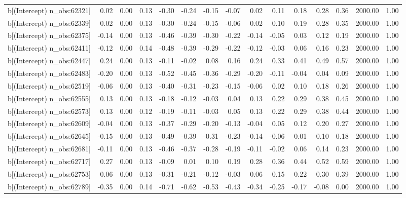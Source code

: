 \begin{table}[ht]
\begin{tabular}{rrrrrrrrrrrrrrr}
  b[(Intercept) n\_obs:62321] & 0.02 & 0.00 & 0.13 & -0.30 & -0.24 & -0.15 & -0.07 & 0.02 & 0.11 & 0.18 & 0.28 & 0.36 & 2000.00 & 1.00 \\ 
  b[(Intercept) n\_obs:62339] & 0.02 & 0.00 & 0.13 & -0.30 & -0.24 & -0.15 & -0.06 & 0.02 & 0.10 & 0.19 & 0.28 & 0.35 & 2000.00 & 1.00 \\ 
  b[(Intercept) n\_obs:62375] & -0.14 & 0.00 & 0.13 & -0.46 & -0.39 & -0.30 & -0.22 & -0.14 & -0.05 & 0.03 & 0.12 & 0.19 & 2000.00 & 1.00 \\ 
  b[(Intercept) n\_obs:62411] & -0.12 & 0.00 & 0.14 & -0.48 & -0.39 & -0.29 & -0.22 & -0.12 & -0.03 & 0.06 & 0.16 & 0.23 & 2000.00 & 1.00 \\ 
  b[(Intercept) n\_obs:62447] & 0.24 & 0.00 & 0.13 & -0.11 & -0.02 & 0.08 & 0.16 & 0.24 & 0.33 & 0.41 & 0.49 & 0.57 & 2000.00 & 1.00 \\ 
  b[(Intercept) n\_obs:62483] & -0.20 & 0.00 & 0.13 & -0.52 & -0.45 & -0.36 & -0.29 & -0.20 & -0.11 & -0.04 & 0.04 & 0.09 & 2000.00 & 1.00 \\ 
  b[(Intercept) n\_obs:62519] & -0.06 & 0.00 & 0.13 & -0.40 & -0.31 & -0.23 & -0.15 & -0.06 & 0.02 & 0.10 & 0.18 & 0.26 & 2000.00 & 1.00 \\ 
  b[(Intercept) n\_obs:62555] & 0.13 & 0.00 & 0.13 & -0.18 & -0.12 & -0.03 & 0.04 & 0.13 & 0.22 & 0.29 & 0.38 & 0.45 & 2000.00 & 1.00 \\ 
  b[(Intercept) n\_obs:62573] & 0.13 & 0.00 & 0.12 & -0.19 & -0.11 & -0.03 & 0.05 & 0.13 & 0.22 & 0.29 & 0.38 & 0.44 & 2000.00 & 1.00 \\ 
  b[(Intercept) n\_obs:62609] & -0.04 & 0.00 & 0.13 & -0.37 & -0.29 & -0.20 & -0.13 & -0.04 & 0.05 & 0.12 & 0.20 & 0.27 & 2000.00 & 1.00 \\ 
  b[(Intercept) n\_obs:62645] & -0.15 & 0.00 & 0.13 & -0.49 & -0.39 & -0.31 & -0.23 & -0.14 & -0.06 & 0.01 & 0.10 & 0.18 & 2000.00 & 1.00 \\ 
  b[(Intercept) n\_obs:62681] & -0.11 & 0.00 & 0.13 & -0.46 & -0.37 & -0.28 & -0.19 & -0.11 & -0.02 & 0.06 & 0.14 & 0.23 & 2000.00 & 1.00 \\ 
  b[(Intercept) n\_obs:62717] & 0.27 & 0.00 & 0.13 & -0.09 & 0.01 & 0.10 & 0.19 & 0.28 & 0.36 & 0.44 & 0.52 & 0.59 & 2000.00 & 1.00 \\ 
  b[(Intercept) n\_obs:62753] & 0.06 & 0.00 & 0.13 & -0.31 & -0.21 & -0.12 & -0.03 & 0.06 & 0.15 & 0.22 & 0.30 & 0.39 & 2000.00 & 1.00 \\ 
  b[(Intercept) n\_obs:62789] & -0.35 & 0.00 & 0.14 & -0.71 & -0.62 & -0.53 & -0.43 & -0.34 & -0.25 & -0.17 & -0.08 & 0.00 & 2000.00 & 1.00 \\ 

\end{tabular}
\end{table}
